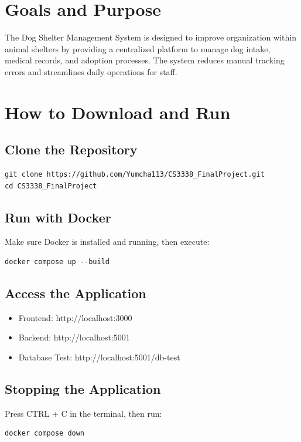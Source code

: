 \documentclass{article}
\begin{document}
\section{Goals and Purpose}
The Dog Shelter Management System is designed to improve organization within animal shelters by providing a centralized platform to manage dog intake, medical records, and adoption processes. The system reduces manual tracking errors and streamlines daily operations for staff.

\section{How to Download and Run}

\subsection{Clone the Repository}
\begin{verbatim}
git clone https://github.com/Yumcha113/CS3338_FinalProject.git
cd CS3338_FinalProject
\end{verbatim}

\subsection{Run with Docker}
Make sure Docker is installed and running, then execute:
\begin{verbatim}
docker compose up --build
\end{verbatim}

\subsection{Access the Application}
\begin{itemize}
    \item Frontend: http://localhost:3000
    \item Backend: http://localhost:5001
    \item Database Test: http://localhost:5001/db-test
\end{itemize}

\subsection{Stopping the Application}
Press CTRL + C in the terminal, then run:
\begin{verbatim}
docker compose down
\end{verbatim}
\end{document}
